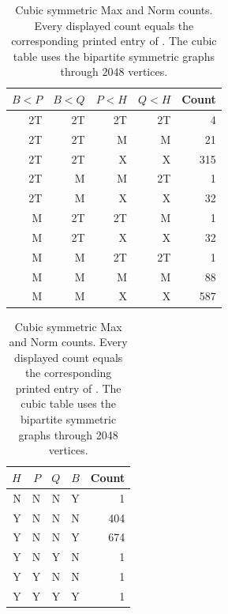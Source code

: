 \begin{table}[p]
\centering
\begin{minipage}[t]{.55\textwidth}
\centering
\begin{tabular}{rrrrr}
\toprule
$B<P$ & $B<Q$ & $P<H$ & $Q<H$ & Count\\
\midrule
2T & 2T & 2T & 2T & 4\\
2T & 2T & M & M & 21\\
2T & 2T & X & X & 315\\
2T & M & M & 2T & 1\\
2T & M & X & X & 32\\
M & 2T & 2T & M & 1\\
M & 2T & X & X & 32\\
M & M & 2T & 2T & 1\\
M & M & M & M & 88\\
M & M & X & X & 587\\
\bottomrule
\end{tabular}
\end{minipage}\hfill
\begin{minipage}[t]{.41\textwidth}
\centering
\begin{tabular}{rrrrr}
\toprule
$H$ & $P$ & $Q$ & $B$ & Count\\
\midrule
N & N & N & Y & 1\\
Y & N & N & N & 404\\
Y & N & N & Y & 674\\
Y & N & Y & N & 1\\
Y & Y & N & N & 1\\
Y & Y & Y & Y & 1\\
\bottomrule
\end{tabular}
\end{minipage}
\caption{Cubic symmetric Max and Norm counts.  Every displayed count equals the corresponding printed entry of \cite{L059}.  The cubic table uses the bipartite symmetric graphs through 2048 vertices.}
\end{table}
